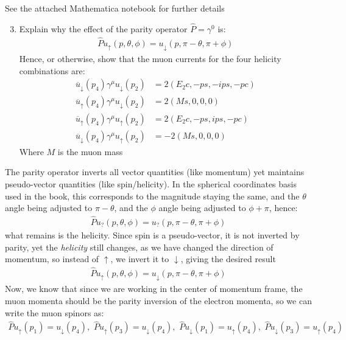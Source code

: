 \documentclass[12pt]{article}
\renewcommand{\bar}{\overline}
\begin{document}
See the attached Mathematica notebook for further details
\begin{problem}
  \begin{enumerate}[label = (\alph*)]
    \setcounter{enumi}{2}
  \item Explain why the effect of the parity operator $\hat{P}=\gamma^0$ is:
    \begin{align*}
      \hat{P}u_\uparrow(p,\theta,\phi)=
      u_\downarrow(p,\pi-\theta,\pi+\phi)
    \end{align*}
    Hence, or otherwise, show that the muon currents for the four helicity combinations are:
    \begin{align*}
      \bar{u}_\downarrow(p_4)\gamma^\mu u_\downarrow(p_2)&=2(E_2c,-ps,-ips,-pc)\\
      \bar{u}_\uparrow(p_4)\gamma^\mu u_\downarrow(p_2)  &=2(Ms,0,0,0)\\
      \bar{u}_\uparrow(p_4)\gamma^\mu u_\uparrow(p_2)    &=2(E_2c,-ps,ips,-pc)\\
      \bar{u}_\downarrow(p_4)\gamma^\mu u_\uparrow(p_2)  &=-2(Ms,0,0,0)
    \end{align*}
    Where $M$ is the muon mass
  \end{enumerate}
\end{problem}
The parity operator inverts all vector quantities (like momentum) yet maintains pseudo-vector quantities (like spin/helicity). In the spherical coordinates basis used in the book, this corresponds to the magnitude staying the same, and the $\theta$ angle being adjusted to $\pi-\theta$, and the $\phi$ angle being adjusted to $\phi+\pi$, hence:
\begin{align*}
  \hat{P}u_?(p,\theta,\phi)=u_?(p,\pi-\theta,\pi+\phi)
\end{align*}
what remains is the helicity. Since spin is a pseudo-vector, it is not inverted by parity, yet the \emph{helicity} still changes, as we have changed the direction of momentum, so instead of $\uparrow$, we invert it to $\downarrow$, giving the desired result
\begin{align*}
  \hat{P}u_\uparrow(p,\theta,\phi)=
  u_\downarrow(p,\pi-\theta,\pi+\phi)
\end{align*}
Now, we know that since we are working in the center of momentum frame, the muon momenta should be the parity inversion of the electron momenta, so we can write the muon spinors as:
\begin{align*}
  \hat{P}u_\uparrow(p_1)=u_\downarrow(p_4),\,\,
  \hat{P}u_\uparrow(p_3)=u_\downarrow(p_4),\,\,
  \hat{P}u_\downarrow(p_1)=u_\uparrow(p_4),\,\,
  \hat{P}u_\downarrow(p_3)=u_\uparrow(p_4)
\end{align*}
\end{document}

